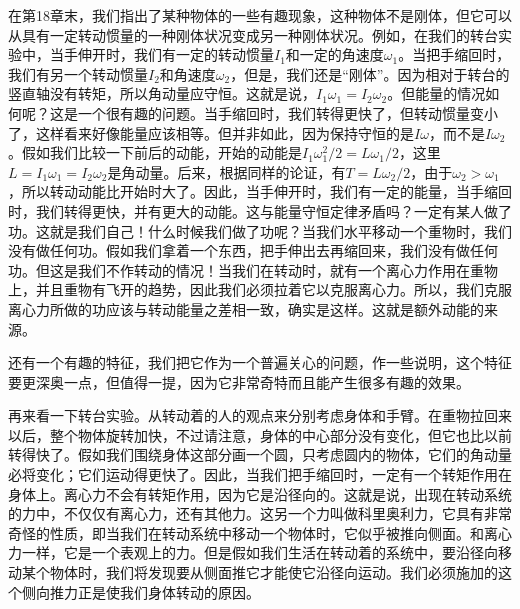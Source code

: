在第18章末，我们指出了某种物体的一些有趣现象，这种物体不是刚体，但它可以从具有一定转动惯量的一种刚体状况变成另一种刚体状况。例如，在我们的转台实验中，当手伸开时，我们有一定的转动惯量$I_1$和一定的角速度$\omega_1$。当把手缩回时，我们有另一个转动惯量$I_2$和角速度$\omega_2$，但是，我们还是“刚体”。因为相对于转台的竖直轴没有转矩，所以角动量应守恒。这就是说，$I_1\omega_1=I_2\omega_2$。但能量的情况如何呢？这是一个很有趣的问题。当手缩回时，我们转得更快了，但转动惯量变小了，这样看来好像能量应该相等。但并非如此，因为保持守恒的是$I\omega$，而不是$I\omega_2$。假如我们比较一下前后的动能，开始的动能是$I_1\omega_1^2/2=L\omega_1/2$，这里$L=I_1\omega_1=I_2\omega_2$是角动量。后来，根据同样的论证，有$T=L\omega_2/2$，由于$\omega_2>\omega_1$，所以转动动能比开始时大了。因此，当手伸开时，我们有一定的能量，当手缩回时，我们转得更快，并有更大的动能。这与能量守恒定律矛盾吗？一定有某人做了功。这就是我们自己！什么时候我们做了功呢？当我们水平移动一个重物时，我们没有做任何功。假如我们拿着一个东西，把手伸出去再缩回来，我们没有做任何功。但这是我们不作转动的情况！当我们在转动时，就有一个离心力作用在重物上，并且重物有飞开的趋势，因此我们必须拉着它以克服离心力。所以，我们克服离心力所做的功应该与转动能量之差相一致，确实是这样。这就是额外动能的来源。

还有一个有趣的特征，我们把它作为一个普遍关心的问题，作一些说明，这个特征要更深奥一点，但值得一提，因为它非常奇特而且能产生很多有趣的效果。

再来看一下转台实验。从转动着的人的观点来分别考虑身体和手臂。在重物拉回来以后，整个物体旋转加快，不过请注意，身体的中心部分没有变化，但它也比以前转得快了。假如我们围绕身体这部分画一个圆，只考虑圆内的物体，它们的角动量必将变化；它们运动得更快了。因此，当我们把手缩回时，一定有一个转矩作用在身体上。离心力不会有转矩作用，因为它是沿径向的。这就是说，出现在转动系统的力中，不仅仅有离心力，还有其他力。这另一个力叫做科里奥利力，它具有非常奇怪的性质，即当我们在转动系统中移动一个物体时，它似乎被推向侧面。和离心力一样，它是一个表观上的力。但是假如我们生活在转动着的系统中，要沿径向移动某个物体时，我们将发现要从侧面推它才能使它沿径向运动。我们必须施加的这个侧向推力正是使我们身体转动的原因。


